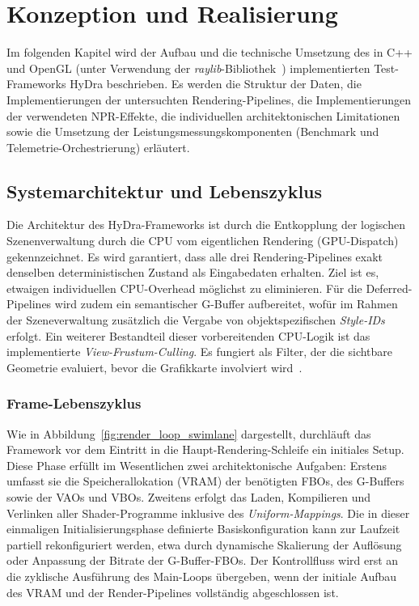\chapter{Konzeption und Realisierung}
\label{ch:04_konzeption_realisierung}

Im folgenden Kapitel wird der Aufbau und die technische Umsetzung des in C++ und OpenGL (unter Verwendung der
\textit{raylib}-Bibliothek~\parencite[vgl.][]{Raylib, RaylibExamples, raysan5RaylibSrcRlglh})
implementierten Test-Frameworks \ac{HyDra} beschrieben.
Es werden die Struktur der Daten, die Implementierungen der untersuchten Rendering-Pipelines, die Implementierungen der
verwendeten \ac{NPR}-Effekte, die individuellen architektonischen Limitationen sowie die Umsetzung der
Leistungsmessungskomponenten (Benchmark und Telemetrie-Orchestrierung) erläutert.


\section{Systemarchitektur und Lebenszyklus}
\label{sec:0401_system_architecture_and_lifecycle}

Die Architektur des \ac{HyDra}-Frameworks ist durch die Entkopplung der logischen Szenenverwaltung durch die \ac{CPU}
vom eigentlichen Rendering (\ac{GPU}-Dispatch) gekennzeichnet.
Es wird garantiert, dass alle drei Rendering-Pipelines exakt denselben deterministischen Zustand als Eingabedaten
erhalten.
Ziel ist es, etwaigen individuellen \ac{CPU}-Overhead möglichst zu eliminieren.
Für die Deferred-Pipelines wird zudem ein semantischer \ac{G-Buffer} aufbereitet, wofür im Rahmen der Szeneverwaltung
zusätzlich die Vergabe von objektspezifischen \textit{Style-IDs} erfolgt.
Ein weiterer Bestandteil dieser vorbereitenden \ac{CPU}-Logik ist das implementierte \textit{View-Frustum-Culling}.
Es fungiert als Filter, der die sichtbare Geometrie evaluiert, bevor die Grafikkarte involviert
wird~\parencite[vgl.][Kap.~11.2.7, Abschn.~\textit{Frustum Culling}]{gregoryGameEngineArchitecture2018}.

\subsection{Frame-Lebenszyklus}
\label{subsec:040101_frame_lifecycle}

Wie in Abbildung~\ref{fig:render_loop_swimlane} dargestellt, durchläuft das Framework vor dem Eintritt in die
Haupt-Rendering-Schleife ein initiales Setup.
Diese Phase erfüllt im Wesentlichen zwei architektonische Aufgaben:
Erstens umfasst sie die Speicherallokation (\ac{VRAM}) der benötigten \ac{FBO}s, des \ac{G-Buffer}s sowie der
\ac{VAO}s und \ac{VBO}s.
Zweitens erfolgt das Laden, Kompilieren und Verlinken aller Shader-Programme inklusive des \textit{Uniform-Mappings}.
Die in dieser einmaligen Initialisierungsphase definierte Basiskonfiguration kann zur Laufzeit partiell rekonfiguriert
werden, etwa durch dynamische Skalierung der Auflösung oder Anpassung der Bitrate der \ac{G-Buffer}-\ac{FBO}s.
Der Kontrollfluss wird erst an die zyklische Ausführung des Main-Loops übergeben, wenn der initiale Aufbau des \ac{VRAM}
und der Render-Pipelines vollständig abgeschlossen ist.

